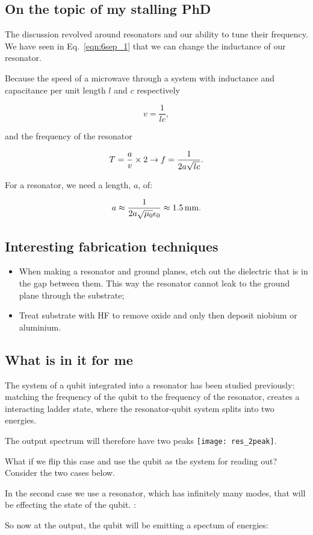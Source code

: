  \subsection{On the topic of my stalling PhD}
  The discussion revolved around resonators and our ability to tune their frequency. We have seen in Eq.~\eqref{eqn:6sep_1} that we can change the inductance of our resonator.
  
  Because the speed of a microwave through a system with inductance and capacitance per unit length $ l $ and $ c $ respectively
  
  \[
  	v = \frac{1}{lc},
  \]

  \noindent and the frequency of the resonator
  
  \[
  	T = \frac{a}{v}\times 2 \rightarrow f = \frac{1}{2a\sqrt{lc}}.
  \]
  
  \noindent For a  resonator, we need a length, $ a $, of:
  
  \[
  	a \approx \frac{1}{2a\sqrt{\mu_0}\epsilon_0} \approx 1.5\,\text{mm}.
  \]
  
  \subsection{Interesting fabrication techniques}
   \begin{itemize}
   	\item When making a resonator and ground planes, etch out the dielectric that is in the gap between them. This way the resonator cannot leak to the ground plane through the substrate;
   	\item Treat substrate with HF to remove oxide and only then deposit niobium or aluminium.
   \end{itemize}
  \subsection{What is in it for me}
   The system of a qubit integrated into a resonator has been studied previously: matching the frequency of the qubit to the frequency of the resonator, creates a interacting ladder state, where the resonator-qubit system splits into two energies. 
   
  
   \noindent The output spectrum will therefore have two peaks \texttt{[image: res\_2peak]}.
   
   What if we flip this case and use the qubit as the system for reading out? Consider the two cases below.
   
   
   In the second case we use a resonator, which has infinitely many modes, that will be effecting the state of the qubit. :
   
   
   So now at the output, the qubit will be emitting a spectum of energies:
   
   
  
